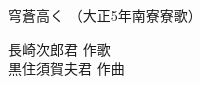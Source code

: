 \documentclass[10pt,b5j]{tarticle} %
\begin{document}
\begin{minipage}[c]{0.7\hsize} %
    \begin{center}
        {\LARGE
            穹蒼高く %
        }
        {\small 
            （大正5年南寮寮歌） %
        }
    \end{center}
\end{minipage}
\begin{minipage}[c]{0.3\hsize} %
    \begin{flushright} %
        長崎次郎君 作歌\\黒住須賀夫君 作曲 %
    \end{flushright}
\end{minipage}
\end{document}
